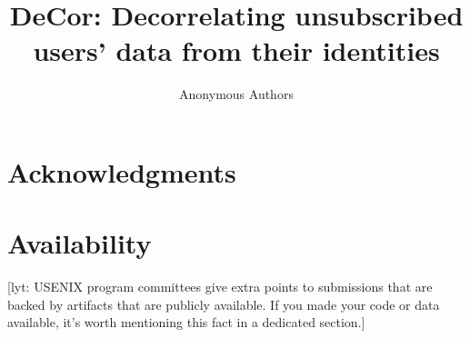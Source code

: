 \documentclass[letterpaper,twocolumn,10pt]{article}
\newcommand{\sys}{DeCor}
\newcommand\lyt[1]{\textcolor{green!55!blue}{[lyt: {#1}]}}
\begin{document}

\date{}

\title{\Large \bf \sys: Decorrelating unsubscribed users' data from their identities}


\author{
{\rm Anonymous Authors}\\
} %

\maketitle









\section*{Acknowledgments}

\section*{Availability}

\lyt{USENIX program committees give extra points to submissions that are
backed by artifacts that are publicly available. If you made your code
or data available, it's worth mentioning this fact in a dedicated
section.}




\end{document}
